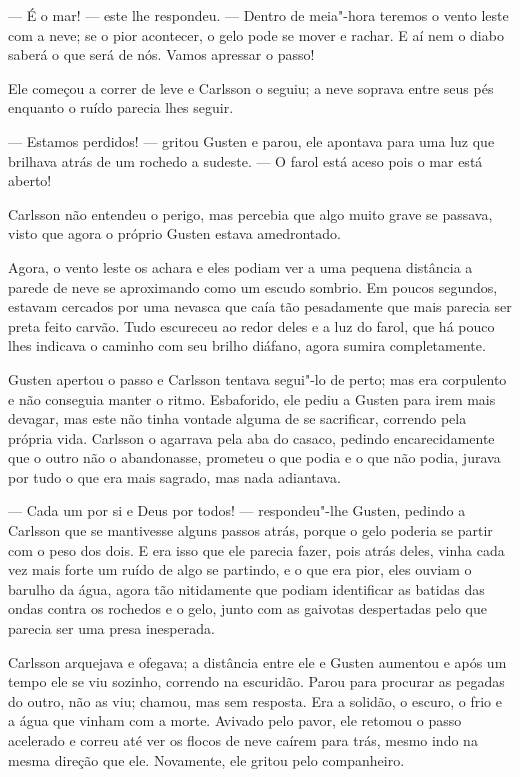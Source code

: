 --- É o mar! --- este lhe respondeu. --- Dentro de meia"-hora teremos o vento leste
com a neve; se o pior acontecer, o gelo pode se mover e rachar. E aí nem o diabo
saberá o que será de nós. Vamos apressar o passo!

Ele começou a correr de leve e Carlsson o seguiu; a neve soprava entre seus pés
enquanto o ruído parecia lhes seguir.

 --- Estamos perdidos! --- gritou Gusten e parou, ele apontava para uma luz que
 brilhava atrás de um rochedo a sudeste. --- O farol está aceso pois o mar está aberto!

Carlsson não entendeu o perigo, mas percebia que algo muito grave se
passava, visto que agora o próprio Gusten estava amedrontado.

 Agora, o vento leste os achara e eles podiam ver a uma pequena distância a
 parede de neve se aproximando como um escudo sombrio. Em poucos segundos, 
 estavam cercados por uma nevasca que caía tão pesadamente que mais parecia ser preta feito
 carvão. Tudo escureceu ao redor deles e a luz do farol, que há pouco lhes
 indicava o caminho com seu brilho diáfano, agora sumira completamente.

 Gusten apertou o passo e Carlsson tentava segui"-lo de perto;
 mas era corpulento e não conseguia manter o ritmo. Esbaforido, ele pediu a
 Gusten para irem mais devagar, mas este não tinha vontade alguma de se sacrificar,
 correndo pela própria vida. Carlsson o agarrava pela aba do casaco, pedindo
 encarecidamente que o outro não o abandonasse, prometeu o que podia e o
 que não podia, jurava por tudo o que era mais sagrado, mas nada adiantava.

--- Cada um por si e Deus por todos! --- respondeu"-lhe Gusten, pedindo a Carlsson
que se mantivesse alguns passos atrás, porque o gelo poderia se
partir com o peso dos dois. E era isso que ele parecia fazer, pois atrás deles,
vinha cada vez mais forte um ruído de algo se partindo, e o que era pior, eles
ouviam o barulho da água, agora tão nitidamente que podiam identificar as
batidas das ondas contra os rochedos e o gelo, junto com as gaivotas despertadas
pelo que parecia ser uma presa inesperada.

Carlsson arquejava e ofegava; a distância entre ele e Gusten aumentou e após um
tempo ele se viu sozinho, correndo na escuridão. Parou para procurar as
pegadas do outro, não as viu; chamou, mas sem resposta. Era a solidão, o escuro,
o frio e a água que vinham com a morte. Avivado pelo pavor, ele retomou o passo acelerado
e correu até ver os flocos de neve caírem para trás, mesmo
indo na mesma direção que ele. Novamente, ele gritou pelo companheiro.

